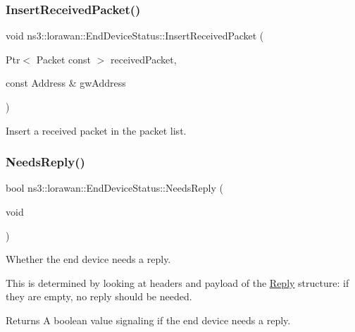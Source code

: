 \subsubsection{\texorpdfstring{Insert\+Received\+Packet()}{InsertReceivedPacket()}}
{\footnotesize\ttfamily void ns3\+::lorawan\+::\+End\+Device\+Status\+::\+Insert\+Received\+Packet (\begin{DoxyParamCaption}\item[{Ptr$<$ Packet const $>$}]{received\+Packet,  }\item[{const Address \&}]{gw\+Address }\end{DoxyParamCaption})}

Insert a received packet in the packet list. \mbox{\label{classns3_1_1lorawan_1_1EndDeviceStatus_a25e0c2769696c42a5e62088b2ba0bb2a}} 
\subsubsection{\texorpdfstring{Needs\+Reply()}{NeedsReply()}}
{\footnotesize\ttfamily bool ns3\+::lorawan\+::\+End\+Device\+Status\+::\+Needs\+Reply (\begin{DoxyParamCaption}\item[{void}]{ }\end{DoxyParamCaption})}

Whether the end device needs a reply.

This is determined by looking at headers and payload of the \hyperlink{structns3_1_1lorawan_1_1EndDeviceStatus_1_1Reply}{Reply} structure\+: if they are empty, no reply should be needed.

\begin{DoxyReturn}{Returns}
A boolean value signaling if the end device needs a reply. 
\end{DoxyReturn}
\mbox{\label{classns3_1_1lorawan_1_1EndDeviceStatus_a0a5445bfba22ce6dd318128eb4e8bc59}} 
